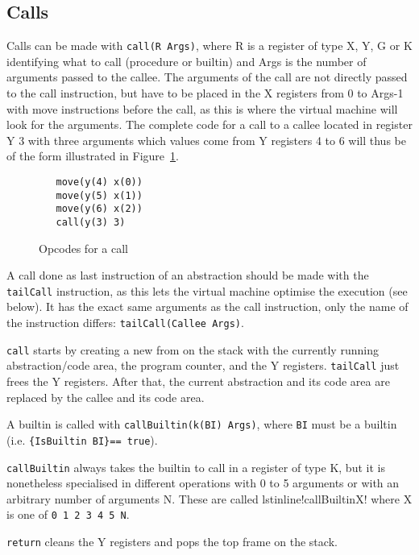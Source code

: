\documentclass[a4paper]{memoir}
\begin{document}
\subsection{Calls}\label{sec:opcode:calls}
Calls can be made with \lstinline!call(R Args)!, where R is a register of type
X, Y, G or K
identifying what to call (procedure or builtin) and Args is the number of
arguments passed to the callee. The arguments of the call are not directly
passed to the call instruction, but have to be placed in the X registers from 0
to Args-1 with move instructions before the call, as this is where the virtual
machine will look for the arguments. The complete code for a call to a callee
located in register Y 3 with three arguments which values come from Y registers
4 to 6 will thus be of the form illustrated in
Figure~\ref{fig:opcodes:callexample}.
\begin{figure}[h]
\begin{lstlisting}
   move(y(4) x(0))
   move(y(5) x(1))
   move(y(6) x(2))
   call(y(3) 3)
\end{lstlisting}
\caption{Opcodes for a call}
\label{fig:opcodes:callexample}
\end{figure}


A call done as last instruction of an abstraction should be made with the
\lstinline!tailCall! instruction, as this lets the virtual machine optimise the
execution (see below). It has the exact same arguments as the call instruction, only the
name of the instruction differs: \lstinline!tailCall(Callee Args)!.

\lstinline!call! starts by creating a new from on the stack with the currently
running abstraction/code area, the program counter, and the Y registers.
\lstinline!tailCall! just frees the Y registers.
After that, the current abstraction and its code area are replaced by the callee
and its code area.


A builtin is called with \lstinline!callBuiltin(k(BI) Args)!, where
\lstinline!BI! must be a builtin (i.e. \lstinline!{IsBuiltin BI}== true!).

\lstinline!callBuiltin! always takes the builtin to call in a register of type
K, but it is nonetheless specialised in different operations with 0 to 5
arguments or with an arbitrary number of arguments N. These are called
lstinline!callBuiltinX! where X is one of \lstinline!0 1 2 3 4 5 N!.

\lstinline!return! cleans the Y registers and pops the top frame on the stack.
\end{document}
